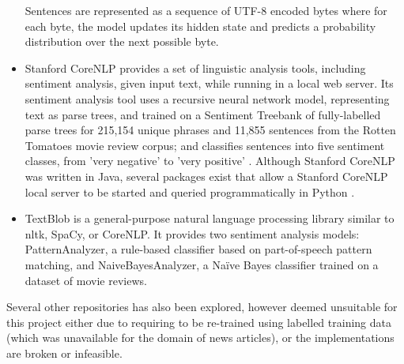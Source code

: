 \documentclass{report}
\begin{document}
\begin{itemize}
		Sentences are represented as a sequence of UTF-8 encoded bytes where for each byte, the model updates its hidden state and predicts a probability distribution over the next possible byte. \cite{OpenAI}
	\item Stanford CoreNLP \cite{StanfordNLP} provides a set of linguistic analysis tools, including sentiment analysis, given input text, while running in a local web server.
		Its sentiment analysis tool uses a recursive neural network model, representing text as parse trees, and trained on a Sentiment Treebank of fully-labelled parse trees for 215,154 unique phrases and 11,855 sentences from the Rotten Tomatoes movie review corpus; and classifies sentences into five sentiment classes, from 'very negative' to 'very positive' \cite{socher2013recursive}.
		Although Stanford CoreNLP was written in Java, several packages exist that allow a Stanford CoreNLP local server to be started and queried programmatically in Python \cite{stanfordcorenlp}.
	\item TextBlob is a general-purpose natural language processing library similar to nltk, SpaCy, or CoreNLP.
		It provides two sentiment analysis models: PatternAnalyzer, a rule-based classifier based on part-of-speech pattern matching, and NaiveBayesAnalyzer, a Na\"{i}ve Bayes classifier trained on a dataset of movie reviews. \cite{textblob}
\end{itemize}
Several other repositories has also been explored, however deemed unsuitable for this project either due to requiring to be re-trained using labelled training data (which was unavailable for the domain of news articles), or the implementations are broken or infeasible.
\end{document}
